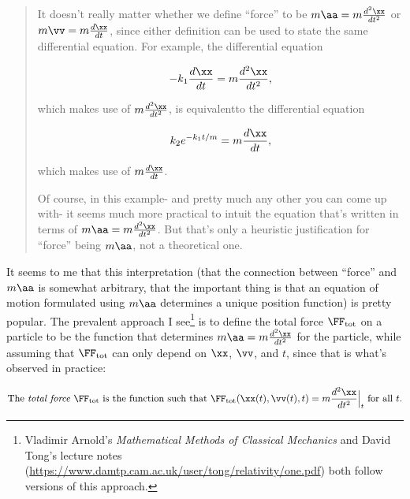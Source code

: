\documentclass{article}
\begin{document}
\begin{quote}
    It doesn't really matter whether we define ``force'' to be $m\aa = m\frac{d^2\xx}{dt^2}$ or $m\vv = m \frac{d\xx}{dt}$, since either definition can be used to state the same differential equation. For example, the differential equation

    \begin{align*}
        -k_1 \frac{d\xx}{dt} = m\frac{d^2\xx}{dt^2},
    \end{align*}

    which makes use of $m \frac{d^2\xx}{dt^2}$, is equivalent\footnotemark to the differential equation

    \begin{align*}
        k_2 e^{-k_1 t/m} = m\frac{d\xx}{dt},
    \end{align*}

    which makes use of $m \frac{d\xx}{dt}$.

    Of course, in this example- and pretty much any other you can come up with- it seems much more practical to intuit the equation that's written in terms of $m \aa = m \frac{d^2\xx}{dt^2}$. But that's only a heuristic justification for ``force'' being $m\aa$, not a theoretical one.
\end{quote}


It seems to me that this interpretation (that the connection between ``force'' and $m\aa$ is somewhat arbitrary, that the important thing is that an equation of motion formulated using $m\aa$ determines a unique position function) is pretty popular. The prevalent approach I see\footnote{Vladimir Arnold's \textit{Mathematical Methods of Classical Mechanics} and David Tong's lecture notes (\url{https://www.damtp.cam.ac.uk/user/tong/relativity/one.pdf}) both follow versions of this approach.} is to define the total force $\FF_{\text{tot}}$ on a particle to be the function that determines $m\aa = m \frac{d^2\xx}{dt^2}$ for the particle, while assuming that $\FF_{\text{tot}}$ can only depend on $\xx$, $\vv$, and $t$, since that is what's observed in practice:

\begin{align*}
    \text{The \textit{total force} $\FF_{\text{tot}}$ is the function such that } \FF_{\text{tot}}(\xx(t), \vv(t), t) = m \frac{d^2\xx}{dt^2}\Big|_t \text{ for all $t$}.
\end{align*}
\end{document}
